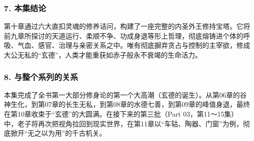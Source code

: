 \subsubsection{7. 本集结论}
第十章通过六大直扣灵魂的修养诘问，构建了一座完整的内圣外王修持宝塔。它将前九章所探讨的天道运行、柔顺不争、功成身退等形上哲理，彻底熔铸进个体的呼吸、气血、感官、治理与亲密关系之中。唯有彻底摒弃贪占与控制的主宰欲，修成大公无私的“玄德”，人类才能重获如赤子般永不衰竭的生命活力。

\subsubsection{8. 与整个系列的关系}
本集完成了全书第一大部分修身论的第一个大高潮（玄德的诞生）。从第06章的谷神生化，到第07章的长生无私，到第08章的水德七善，到第09章的峰值身退，最终在第10章收束于“玄德”的大圆满。在接下来的第三批（Part 03，第11～15集）中，老子将再次把视角拉回到现实世界，在第11章以“车轱、陶器、门窗”为例，彻底掀开“无之以为用”的千古机关。